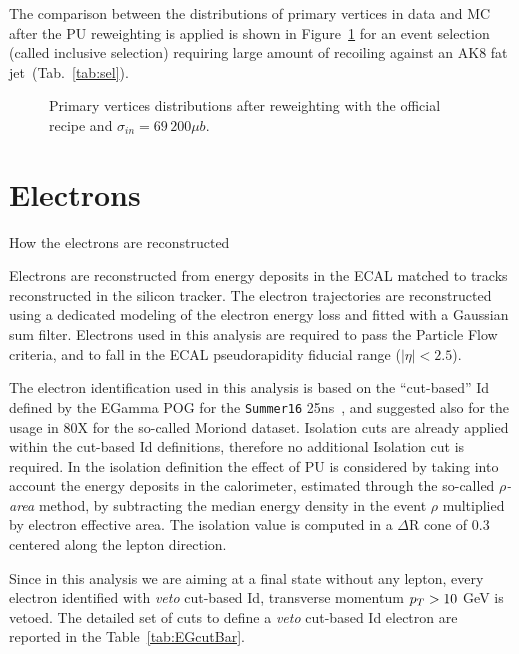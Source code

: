 The comparison between the distributions of primary vertices in data and MC after the PU reweighting is applied is shown in Figure~\ref{fig:npv} for an event selection (called inclusive selection) requiring large amount of \met recoiling against an AK8 fat jet~(Tab.~\ref{tab:sel}).
 
 \begin{figure}[!htb]
  \centering
  \caption{Primary vertices distributions after reweighting with the official recipe and $\sigma_{in}=69\,200 \mu b$.}
  \label{fig:npv}
 \end{figure}


\section{Electrons}\label{ssec:electrons}
{\color{red} How the electrons are reconstructed}

Electrons are reconstructed from energy deposits in the ECAL matched to tracks reconstructed in the silicon tracker. 
The electron trajectories are reconstructed using a dedicated modeling of the electron energy loss and fitted with a Gaussian sum filter.
Electrons used in this analysis are required to pass the Particle Flow criteria, and to fall in the ECAL pseudorapidity fiducial range ($|\eta|<2.5$). 

The electron identification used in this analysis is based on the ``cut-based'' Id defined by the EGamma POG for the \texttt{Summer16} 25ns~\cite{EGammaPOG_ele}, and suggested also for the usage in 80X for the so-called Moriond dataset.
Isolation cuts are already applied within the cut-based Id definitions, therefore no additional Isolation cut is required.
In the isolation definition the effect of PU is considered by taking into account the energy deposits in the calorimeter, estimated through the so-called \emph{$\rho$-area} method, by subtracting the median energy density in the event $\rho$ multiplied by electron effective area.
The isolation value is computed in a $\Delta$R cone of 0.3 centered along the lepton direction.

Since in this analysis we are aiming at a final state without any lepton, every electron identified with \emph{veto} cut-based Id, transverse momentum $p_T > 10$ GeV is vetoed. The detailed set of cuts to define a \emph{veto} cut-based Id electron are reported in the Table~\ref{tab:EGcutBar}.

